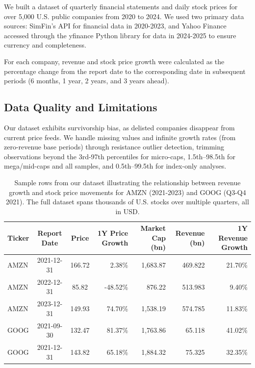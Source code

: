 \documentclass[11pt]{article}
\begin{document}
We built a dataset of quarterly financial statements and daily stock prices for over 5,000 U.S. public companies from 2020 to 2024. We used two primary data sources: SimFin's API \citep{simfin} for financial data in 2020-2023, and Yahoo Finance accessed through the yfinance Python library \citep{yfinance} for data in 2024-2025 to ensure currency and completeness.

For each company, revenue and stock price growth were calculated as the percentage change from the report date to the corresponding date in subsequent periods (6 months, 1 year, 2 years, and 3 years ahead).

\subsection{Data Quality and Limitations} 

Our dataset exhibits survivorship bias, as delisted companies disappear from current price feeds. We handle missing values and infinite growth rates (from zero-revenue base periods) through resistance outlier detection, trimming observations beyond the 3rd-97th percentiles for micro-caps, 1.5th–98.5th for mega/mid-caps and all samples, and 0.5th–99.5th for index-only analyses.

\begin{table}[!htbp]
  \setlength{\tabcolsep}{4pt}
  \centering
\caption{Sample rows from our dataset illustrating the relationship between revenue growth and stock price movements for AMZN (2021-2023) and GOOG (Q3-Q4 2021). The full dataset spans thousands of U.S. stocks over multiple quarters, all in USD.}
  \label{tab:sample-data}
  \begin{tabular}{lccrrrr}
    \toprule
    Ticker & Report Date & Price & 1Y Price Growth & Market Cap (bn) & Revenue (bn) & 1Y Revenue Growth \\
    \midrule
    AMZN & 2021-12-31 & 166.72 & 2.38\%   & 1,683.87 & 469.822 &  21.70\% \\
    AMZN & 2022-12-31 &  85.82 & -48.52\% &   876.22 & 513.983 &   9.40\% \\
    AMZN & 2023-12-31 & 149.93 & 74.70\%  & 1,538.19 & 574.785 &  11.83\% \\
    \midrule
    GOOG & 2021-09-30 & 132.47 & 81.37\%  & 1,763.86 & 65.118 &   41.02\% \\
    GOOG & 2021-12-31 & 143.82 & 65.18\%  & 1,884.32 & 75.325 &   32.35\% \\
    \bottomrule
  \end{tabular}
\end{table}
\end{document}
